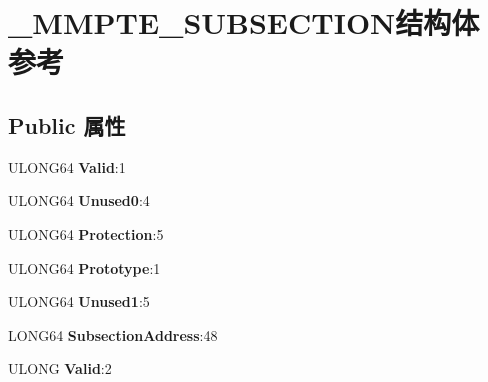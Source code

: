 \hypertarget{struct___m_m_p_t_e___s_u_b_s_e_c_t_i_o_n}{}\section{\+\_\+\+M\+M\+P\+T\+E\+\_\+\+S\+U\+B\+S\+E\+C\+T\+I\+O\+N结构体 参考}
\label{struct___m_m_p_t_e___s_u_b_s_e_c_t_i_o_n}
\subsection*{Public 属性}
\begin{DoxyCompactItemize}
\item 
\mbox{\label{struct___m_m_p_t_e___s_u_b_s_e_c_t_i_o_n_ae0219c1fd4bfbbd2fef333345dcd459d}} 
U\+L\+O\+N\+G64 {\bfseries Valid}\+:1
\item 
\mbox{\label{struct___m_m_p_t_e___s_u_b_s_e_c_t_i_o_n_a31e8b0c92ea247f7ba8db0ef626dfdf9}} 
U\+L\+O\+N\+G64 {\bfseries Unused0}\+:4
\item 
\mbox{\label{struct___m_m_p_t_e___s_u_b_s_e_c_t_i_o_n_a6521df7b10d9809c5ed390e253e6a4f3}} 
U\+L\+O\+N\+G64 {\bfseries Protection}\+:5
\item 
\mbox{\label{struct___m_m_p_t_e___s_u_b_s_e_c_t_i_o_n_a74aecf4f8918ebaaf6c88a44c28b5dc0}} 
U\+L\+O\+N\+G64 {\bfseries Prototype}\+:1
\item 
\mbox{\label{struct___m_m_p_t_e___s_u_b_s_e_c_t_i_o_n_acfede3b9816cba3c114cddbe10911c64}} 
U\+L\+O\+N\+G64 {\bfseries Unused1}\+:5
\item 
\mbox{\label{struct___m_m_p_t_e___s_u_b_s_e_c_t_i_o_n_a3ac536db486fe355353c9a2545761b74}} 
L\+O\+N\+G64 {\bfseries Subsection\+Address}\+:48
\item 
\mbox{\label{struct___m_m_p_t_e___s_u_b_s_e_c_t_i_o_n_ae0219c1fd4bfbbd2fef333345dcd459d}} 
U\+L\+O\+NG {\bfseries Valid}\+:2
\item 

\end{DoxyCompactItemize}
